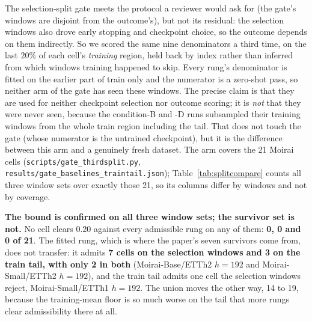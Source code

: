 The selection-split gate meets the protocol a reviewer would ask for (the gate's
windows are disjoint from the outcome's), but not its residual: the selection windows
also drove early stopping and checkpoint choice, so the outcome depends on them
indirectly.  So we scored the same nine denominators a third time, on the last
$20\%$ of each cell's \emph{training} region, held back by index rather than inferred
from which windows training happened to skip.  Every rung's denominator is fitted on
the earlier part of train only and the numerator is a zero-shot pass, so neither arm
of the gate has seen these windows.  The precise claim is that they are used for
neither checkpoint selection nor outcome scoring; it is \emph{not} that they were
never seen, because the condition-B and -D runs subsampled their training windows
from the whole train region including the tail.  That does not touch the gate (whose
numerator is the untrained checkpoint), but it is the difference between this arm and
a genuinely fresh dataset.  The arm covers the 21 Moirai cells
(\texttt{scripts/gate\_thirdsplit.py}, \texttt{results/gate\_baselines\_traintail.json});
Table~\ref{tab:splitcompare} counts all three window sets over exactly those 21, so
its columns differ by windows and not by coverage.

\begin{table}[ht]
\centering
\caption{\textbf{The eight-rung ladder on three window sets.}  Cells each rung
admits: its denominator is at least as good as the training-mean floor on that cell
\emph{and} the cell's $\Vb{b}$ clears $0.20$.  Every column is out of the same 21
Moirai cells (the ones the train-tail arm covers), so the counts are comparable
across columns and are not the 31- and 32-cell counts quoted elsewhere.
\emph{Selection} is the paper's primary, \emph{held-out} the retrospective variant,
and \emph{train tail} the last $20\%$ of the training region, used for neither
checkpoint selection nor outcome scoring.  The bottom row is the paper's conservative
bound, and it is zero on all three.}
\label{tab:splitcompare}

\end{table}

\textbf{The bound is confirmed on all three window sets; the survivor set is not.}
No cell clears $0.20$ against every admissible rung on any of them: \textbf{0, 0 and
0 of 21}.  The fitted rung, which is where the paper's seven survivors come from,
does not transfer: it admits \textbf{7 cells on the selection windows and 3 on the
train tail, with only 2 in both} (Moirai-Base/ETTh2 $h{=}192$ and
Moirai-Small/ETTh2 $h{=}192$), and the train tail admits one cell the selection
windows reject, Moirai-Small/ETTh1 $h{=}192$.  The union moves the other way, 14 to
19, because the training-mean floor is so much worse on the tail that more rungs
clear admissibility there at all.

